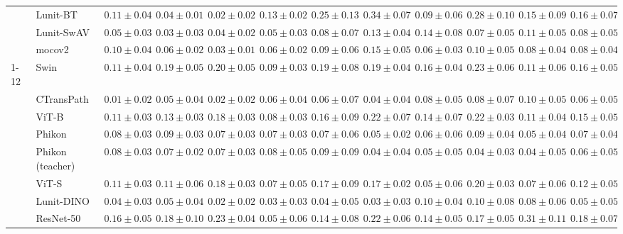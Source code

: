 \begin{tabular}{ll|cccc|c|cccc|c}
 & Lunit-BT & $0.11 \pm 0.04$ & $0.04 \pm 0.01$ & $\mathbf{0.02 \pm 0.02}$ & $0.13 \pm 0.02$ & $0.25 \pm 0.13$ & $0.34 \pm 0.07$ & $0.09 \pm 0.06$ & $0.28 \pm 0.10$ & $0.15 \pm 0.09$ & $0.16 \pm 0.07$ \\
 & Lunit-SwAV & $0.05 \pm 0.03$ & $0.03 \pm 0.03$ & $0.04 \pm 0.02$ & $0.05 \pm 0.03$ & $0.08 \pm 0.07$ & $0.13 \pm 0.04$ & $0.14 \pm 0.08$ & $0.07 \pm 0.05$ & $0.11 \pm 0.05$ & $0.08 \pm 0.05$ \\
 & mocov2 & $0.10 \pm 0.04$ & $0.06 \pm 0.02$ & $0.03 \pm 0.01$ & $0.06 \pm 0.02$ & $0.09 \pm 0.06$ & $0.15 \pm 0.05$ & $0.06 \pm 0.03$ & $0.10 \pm 0.05$ & $0.08 \pm 0.04$ & $0.08 \pm 0.04$ \\
\cline{1-12}
\multirow[t]{12}{*}{Transformer} & Swin & $0.11 \pm 0.04$ & $0.19 \pm 0.05$ & $0.20 \pm 0.05$ & $0.09 \pm 0.03$ & $0.19 \pm 0.08$ & $0.19 \pm 0.04$ & $0.16 \pm 0.04$ & $0.23 \pm 0.06$ & $0.11 \pm 0.06$ & $0.16 \pm 0.05$ \\
 & CTransPath & $\mathbf{0.01 \pm 0.02}$ & $0.05 \pm 0.04$ & $\mathbf{0.02 \pm 0.02}$ & $0.06 \pm 0.04$ & $0.06 \pm 0.07$ & $0.04 \pm 0.04$ & $0.08 \pm 0.05$ & $0.08 \pm 0.07$ & $0.10 \pm 0.05$ & $0.06 \pm 0.05$ \\
 & ViT-B & $0.11 \pm 0.03$ & $0.13 \pm 0.03$ & $0.18 \pm 0.03$ & $0.08 \pm 0.03$ & $0.16 \pm 0.09$ & $0.22 \pm 0.07$ & $0.14 \pm 0.07$ & $0.22 \pm 0.03$ & $0.11 \pm 0.04$ & $0.15 \pm 0.05$ \\
 & Phikon & $0.08 \pm 0.03$ & $0.09 \pm 0.03$ & $0.07 \pm 0.03$ & $0.07 \pm 0.03$ & $0.07 \pm 0.06$ & $0.05 \pm 0.02$ & $0.06 \pm 0.06$ & $0.09 \pm 0.04$ & $0.05 \pm 0.04$ & $0.07 \pm 0.04$ \\
 & Phikon (teacher) & $0.08 \pm 0.03$ & $0.07 \pm 0.02$ & $0.07 \pm 0.03$ & $0.08 \pm 0.05$ & $0.09 \pm 0.09$ & $0.04 \pm 0.04$ & $\mathbf{0.05 \pm 0.05}$ & $\mathbf{0.04 \pm 0.03}$ & $\mathbf{0.04 \pm 0.05}$ & $0.06 \pm 0.05$ \\
 & ViT-S & $0.11 \pm 0.03$ & $0.11 \pm 0.06$ & $0.18 \pm 0.03$ & $0.07 \pm 0.05$ & $0.17 \pm 0.09$ & $0.17 \pm 0.02$ & $0.05 \pm 0.06$ & $0.20 \pm 0.03$ & $0.07 \pm 0.06$ & $0.12 \pm 0.05$ \\
 & Lunit-DINO & $0.04 \pm 0.03$ & $0.05 \pm 0.04$ & $0.02 \pm 0.02$ & $0.03 \pm 0.03$ & $\mathbf{0.04 \pm 0.05}$ & $\mathbf{0.03 \pm 0.03}$ & $0.10 \pm 0.04$ & $0.10 \pm 0.08$ & $0.08 \pm 0.06$ & $\mathbf{0.05 \pm 0.05}$ \\
 & ResNet-50 & $0.16 \pm 0.05$ & $0.18 \pm 0.10$ & $0.23 \pm 0.04$ & $0.05 \pm 0.06$ & $0.14 \pm 0.08$ & $0.22 \pm 0.06$ & $0.14 \pm 0.05$ & $0.17 \pm 0.05$ & $0.31 \pm 0.11$ & $0.18 \pm 0.07$ \\

\end{tabular}
